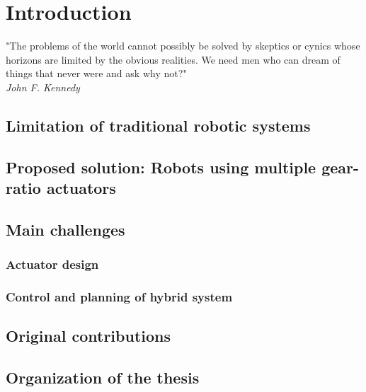 \chapter{Introduction}
\label{sec:Introduction}


{\small
\begin{flushright}
"The problems of the world cannot possibly be solved by skeptics or cynics whose horizons are limited by the obvious realities. We need men who can dream of things that never were and ask why not?" \\ \emph{John F. Kennedy}
\end{flushright}
}

\vspace{+10pt}


\section{Limitation of traditional robotic systems}
\label{sec:limitationOfTraditionnalRoboticSystems}


\section{Proposed solution: Robots using multiple gear-ratio actuators}
\label{sec:ProposedSolutionRobotsUsingMultipleGearRatioActuators}


\section{Main challenges}
\label{sec:MainChallenges}

\subsection{Actuator design}
\label{sec:ActuatorDesign}

\subsection{Control and planning of hybrid system}
\label{sec:ControlAndPlanningOfHybridSystem}



\section{Original contributions}
\label{sec:contribution}


\section{Organization of the thesis}
\label{sec:OrganisationOfTheThesis}




